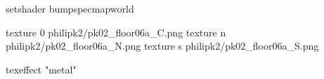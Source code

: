 setshader bumpspecmapworld

texture 0 philipk2/pk02_floor06a_C.png
texture n philipk2/pk02_floor06a_N.png
texture s philipk2/pk02_floor06a_S.png

texeffect "metal"
